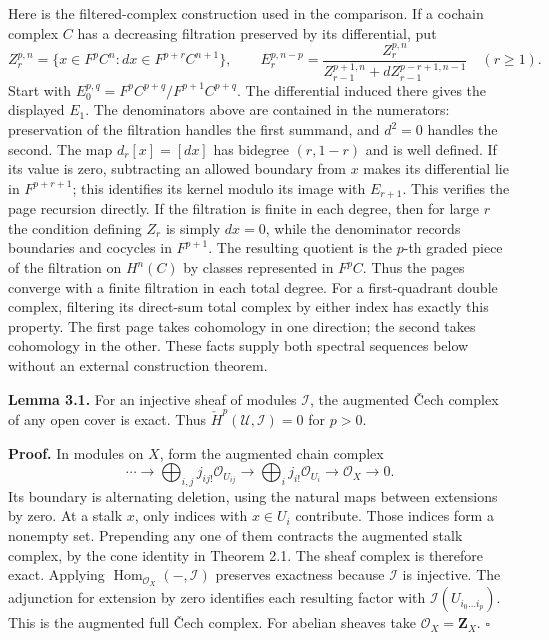 \documentclass[11pt]{article}
\begin{document}
Here is the filtered-complex construction used in the comparison. If a
cochain complex \(C\) has a decreasing filtration preserved by its
differential, put \[
Z_r^{p,n}=\{x\in F^pC^n:dx\in F^{p+r}C^{n+1}\},\qquad
E_r^{p,n-p}=\frac{Z_r^{p,n}}{Z_{r-1}^{p+1,n}+dZ_{r-1}^{p-r+1,n-1}}\quad(r\ge1).
\] Start with \(E_0^{p,q}=F^pC^{p+q}/F^{p+1}C^{p+q}\). The differential
induced there gives the displayed \(E_1\). The denominators above are
contained in the numerators: preservation of the filtration handles the
first summand, and \(d^2=0\) handles the second. The map \(d_r[x]=[dx]\)
has bidegree \((r,1-r)\) and is well defined. If its value is zero,
subtracting an allowed boundary from \(x\) makes its differential lie in
\(F^{p+r+1}\); this identifies its kernel modulo its image with
\(E_{r+1}\). This verifies the page recursion directly. If the
filtration is finite in each degree, then for large \(r\) the condition
defining \(Z_r\) is simply \(dx=0\), while the denominator records
boundaries and cocycles in \(F^{p+1}\). The resulting quotient is the
\(p\)-th graded piece of the filtration on \(H^n(C)\) by classes
represented in \(F^pC\). Thus the pages converge with a finite
filtration in each total degree. For a first-quadrant double complex,
filtering its direct-sum total complex by either index has exactly this
property. The first page takes cohomology in one direction; the second
takes cohomology in the other. These facts supply both spectral
sequences below without an external construction theorem.

\textbf{Lemma 3.1.} For an injective sheaf of modules \(\mathcal I\),
the augmented Čech complex of any open cover is exact. Thus
\(\check H^p(\mathcal U,\mathcal I)=0\) for \(p>0\).

\textbf{Proof.} In modules on \(X\), form the augmented chain complex \[
\cdots\to
\bigoplus_{i,j}j_{ij!}\mathcal O_{U_{ij}}
\to\bigoplus_i j_{i!}\mathcal O_{U_i}
\to\mathcal O_X\to0.
\] Its boundary is alternating deletion, using the natural maps between
extensions by zero. At a stalk \(x\), only indices with \(x\in U_i\)
contribute. Those indices form a nonempty set. Prepending any one of
them contracts the augmented stalk complex, by the cone identity in
Theorem 2.1. The sheaf complex is therefore exact. Applying
\(\operatorname{Hom}_{\mathcal O_X}(-,\mathcal I)\) preserves exactness
because \(\mathcal I\) is injective. The adjunction for extension by
zero identifies each resulting factor with
\(\mathcal I(U_{i_0\ldots i_p})\). This is the augmented full Čech
complex. For abelian sheaves take \(\mathcal O_X=\mathbf Z_X\).
\(\square\)
\end{document}

